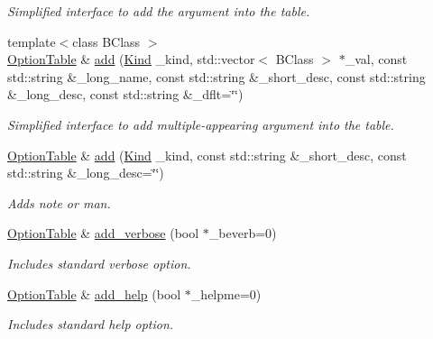\begin{DoxyCompactItemize}
\begin{DoxyCompactList}\small\item\em Simplified interface to add the argument into the table. \item\end{DoxyCompactList}\item 
{\footnotesize template$<$class BClass $>$ }\\\hyperlink{classpoptmx_1_1OptionTable}{OptionTable} \& \hyperlink{group__poptmx_ga3d647be8f19d1059ba235a1838fbe1c1}{add} (\hyperlink{group__poptmx_ga3f58821f631b466567d001183ca437e2}{Kind} \_\-kind, std::vector$<$ BClass $>$ $\ast$\_\-val, const std::string \&\_\-long\_\-name, const std::string \&\_\-short\_\-desc, const std::string \&\_\-long\_\-desc, const std::string \&\_\-dflt=\char`\"{}\char`\"{})
\begin{DoxyCompactList}\small\item\em Simplified interface to add multiple-\/appearing argument into the table. \item\end{DoxyCompactList}\item 
\hyperlink{classpoptmx_1_1OptionTable}{OptionTable} \& \hyperlink{classpoptmx_1_1OptionTable_a36c65b15ac4f811748dd16f62d51a02f}{add} (\hyperlink{group__poptmx_ga3f58821f631b466567d001183ca437e2}{Kind} \_\-kind, const std::string \&\_\-short\_\-desc, const std::string \&\_\-long\_\-desc=\char`\"{}\char`\"{})
\begin{DoxyCompactList}\small\item\em Adds note or man. \item\end{DoxyCompactList}\item 
\hyperlink{classpoptmx_1_1OptionTable}{OptionTable} \& \hyperlink{classpoptmx_1_1OptionTable_a85a22b6aaa6a23b57757b8d78c1c3382}{add\_\-verbose} (bool $\ast$\_\-beverb=0)
\begin{DoxyCompactList}\small\item\em Includes standard verbose option. \item\end{DoxyCompactList}\item 
\hyperlink{classpoptmx_1_1OptionTable}{OptionTable} \& \hyperlink{classpoptmx_1_1OptionTable_ab75ea988a9e7f4df929819faf55cf5bb}{add\_\-help} (bool $\ast$\_\-helpme=0)
\begin{DoxyCompactList}\small\item\em Includes standard help option. \item\end{DoxyCompactList}\item 

\end{DoxyCompactItemize}
